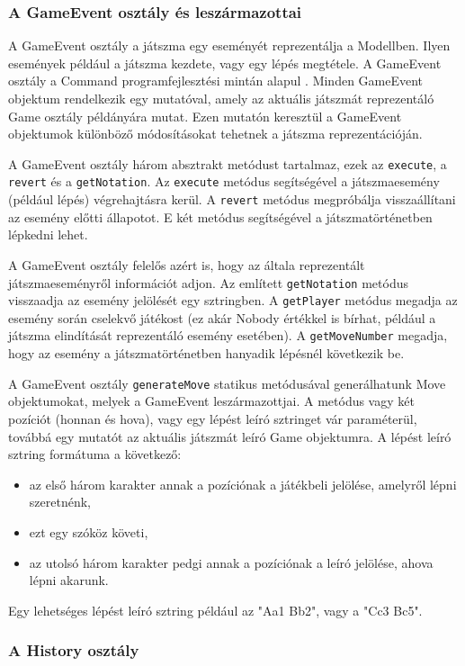 \documentclass[12pt, twoside]{report}
\begin{document}
\subsubsection{A GameEvent osztály és leszármazottai}

A GameEvent osztály a játszma egy eseményét reprezentálja a Modellben. Ilyen események például a játszma kezdete, vagy egy lépés megtétele. A GameEvent osztály a Command programfejlesztési mintán alapul \cite{designpatterns}. Minden GameEvent objektum rendelkezik egy mutatóval, amely az aktuális játszmát reprezentáló Game osztály példányára mutat. Ezen mutatón keresztül a GameEvent objektumok különböző módosításokat tehetnek a játszma reprezentációján.

A GameEvent osztály három absztrakt metódust tartalmaz, ezek az {\tt execute}, a {\tt revert} és a {\tt getNotation}. Az {\tt execute} metódus segítségével a játszmaesemény (például lépés) végrehajtásra kerül. A {\tt revert} metódus megpróbálja visszaállítani az esemény előtti állapotot. E két metódus segítségével a játsz\-ma\-tör\-té\-net\-ben lépkedni lehet.

A GameEvent osztály felelős azért is, hogy az általa reprezentált játszmaeseményről információt adjon. Az említett {\tt getNotation} metódus visszaadja az esemény jelölését egy sztringben. A {\tt getPlayer} metódus megadja az esemény során cselekvő játékost (ez akár Nobody értékkel is bírhat, például a játszma elindítását reprezentáló esemény esetében). A {\tt getMoveNumber} megadja, hogy az esemény a játszmatörténetben hanyadik lépésnél következik be.

A GameEvent osztály {\tt generateMove} statikus metódusával generálhatunk Move objektumokat, melyek a GameEvent leszármazottjai. A metódus vagy két pozíciót (honnan és hova), vagy egy lépést leíró sztringet vár paraméterül, továbbá egy mutatót az aktuális játszmát leíró Game objektumra. A lépést leíró sztring formátuma a következő:
\begin{itemize}
	\item az első három karakter annak a pozíciónak a játékbeli jelölése, amelyről lépni szeretnénk,
	\item ezt egy szóköz követi,
	\item az utolsó három karakter pedgi annak a pozíciónak a leíró jelölése, ahova lépni akarunk.
\end{itemize}
Egy lehetséges lépést leíró sztring például az "Aa1 Bb2", vagy a "Cc3 Bc5".

\subsubsection{A History osztály}
\end{document}
